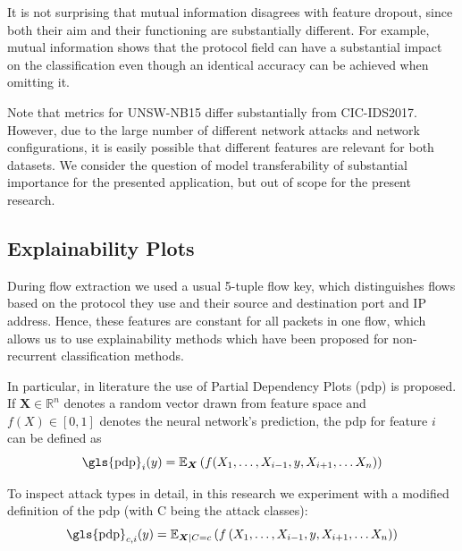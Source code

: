 \documentclass[conference]{IEEEtran}
\begin{document}
It is not surprising that mutual information disagrees with feature dropout, since both their aim and their functioning are substantially different. For example, mutual information shows that the protocol field can have a substantial impact on the classification even though an identical accuracy can be achieved when omitting it.


Note that metrics for UNSW-NB15 differ substantially from CIC-IDS2017. However, due to the large number of different network attacks and network configurations, it is easily possible that different features are relevant for both datasets. We consider the question of model transferability of substantial importance for the presented application, but out of scope for the present research.

\subsection{Explainability Plots}
During flow extraction we used a usual 5-tuple flow key, which distinguishes flows based on the protocol they use and their source and destination port and IP address. Hence, these features are constant for all packets in one flow, which allows us to use explainability methods which have been proposed for non-recurrent classification methods.

In particular,  in literature the use of Partial Dependency Plots (\gls{pdp}) is proposed. If $\boldsymbol X \in \mathbb R ^n$ denotes a random vector drawn from feature space and $f(X) \in [0,1]$ denotes the neural network's prediction, the \gls{pdp} for feature $i$ can be defined as
\begin{equation} \label{eq:pdp}
\text{\gls{pdp}}_i(y) = \mathbb E_{\boldsymbol X}\left(f(X_1,\ldots,X_{i-1},y,X_{i+1},\ldots X_n)\right)
\end{equation}


To inspect attack types in detail, in this research we experiment with a modified definition of the \gls{pdp}  (with C being the attack classes):
\begin{equation} \label{eq:pdp_conditional}
\text{\gls{pdp}}_{c,i}(y) = \mathbb E_{\boldsymbol X | C = c} \left(f \left( X_1,\ldots,X_{i-1},y,X_{i+1},\ldots X_n \right) \right)
\end{equation}
\end{document}
